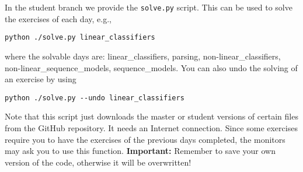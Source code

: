 In the student branch we provide the \verb+solve.py+ script. This can be used
to solve the exercises of each day, e.g.,

\begin{verbatim}
python ./solve.py linear_classifiers
\end{verbatim}

\noindent where the solvable days are: linear_classifiers, parsing, non-linear_classifiers, non-linear_sequence_models, sequence_models. You can also undo the solving of an exercise by using

\begin{verbatim}
python ./solve.py --undo linear_classifiers
\end{verbatim}

Note that this script just downloads the master or student versions of certain files from the GitHub repository. It needs an Internet connection. Since some exercises require you to have the exercises of the previous days completed, the monitors may ask you to use this function. \textbf{Important:} Remember to save your own version of the code, otherwise it will be overwritten!
